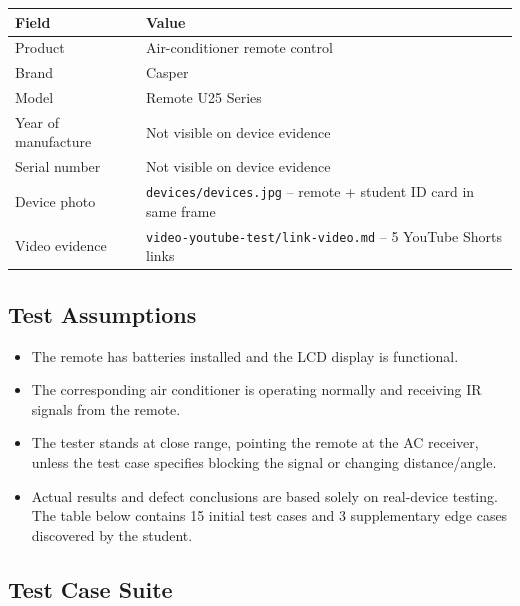 \documentclass[12pt, a4paper]{article}
\begin{document}
\begin{table}[h!]
\centering
\begin{tabularx}{\textwidth}{@{} L{4.5cm} X @{}}
\toprule
{}
\textbf{Field} & \textbf{Value} \\
\midrule
Product & Air-conditioner remote control \\
Brand & Casper \\
Model & Remote U25 Series \\
Year of manufacture & Not visible on device evidence \\
Serial number & Not visible on device evidence \\
Device photo & \texttt{devices/devices.jpg} -- remote + student ID card in same frame \\
Video evidence & \texttt{video-youtube-test/link-video.md} -- 5 YouTube Shorts links \\
\bottomrule
\end{tabularx}
\end{table}

\subsection{Test Assumptions}

\begin{itemize}[leftmargin=*,itemsep=2pt]
  \item The remote has batteries installed and the LCD display is functional.
  \item The corresponding air conditioner is operating normally and receiving IR signals from the remote.
  \item The tester stands at close range, pointing the remote at the AC receiver, unless the test case specifies blocking the signal or changing distance/angle.
  \item Actual results and defect conclusions are based solely on real-device testing. The table below contains 15 initial test cases and 3 supplementary edge cases discovered by the student.
\end{itemize}

\subsection{Test Case Suite}
\end{document}

